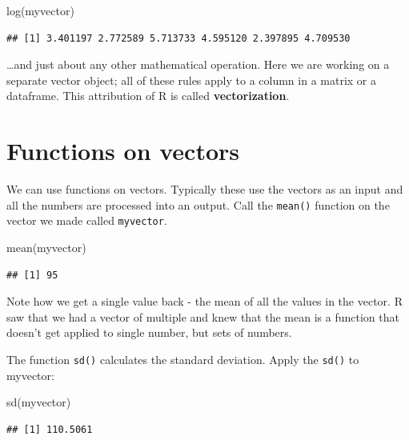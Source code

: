 \documentclass[
]{book}
\newenvironment{Shaded}{\begin{snugshade}}{\end{snugshade}}
\newcommand{\FunctionTok}[1]{\textcolor[rgb]{0.00,0.00,0.00}{#1}}
\newcommand{\NormalTok}[1]{#1}
\begin{document}
\begin{Shaded}
\begin{Highlighting}[]
\FunctionTok{log}\NormalTok{(myvector)}
\end{Highlighting}
\end{Shaded}

\begin{verbatim}
## [1] 3.401197 2.772589 5.713733 4.595120 2.397895 4.709530
\end{verbatim}

\ldots and just about any other mathematical operation. Here we are working on a separate vector object; all of these rules apply to a column in a matrix or a dataframe. This attribution of R is called \textbf{vectorization}.

\hypertarget{functions-on-vectors}{%
\section{Functions on vectors}\label{functions-on-vectors}}

We can use functions on vectors. Typically these use the vectors as an input and all the numbers are processed into an output. Call the \texttt{mean()} function on the vector we made called \texttt{myvector}.

\begin{Shaded}
\begin{Highlighting}[]
\FunctionTok{mean}\NormalTok{(myvector)}
\end{Highlighting}
\end{Shaded}

\begin{verbatim}
## [1] 95
\end{verbatim}

Note how we get a single value back - the mean of all the values in the vector. R saw that we had a vector of multiple and knew that the mean is a function that doesn't get applied to single number, but sets of numbers.

The function \texttt{sd()} calculates the standard deviation. Apply the \texttt{sd()} to myvector:

\begin{Shaded}
\begin{Highlighting}[]
\FunctionTok{sd}\NormalTok{(myvector)}
\end{Highlighting}
\end{Shaded}

\begin{verbatim}
## [1] 110.5061
\end{verbatim}
\end{document}
